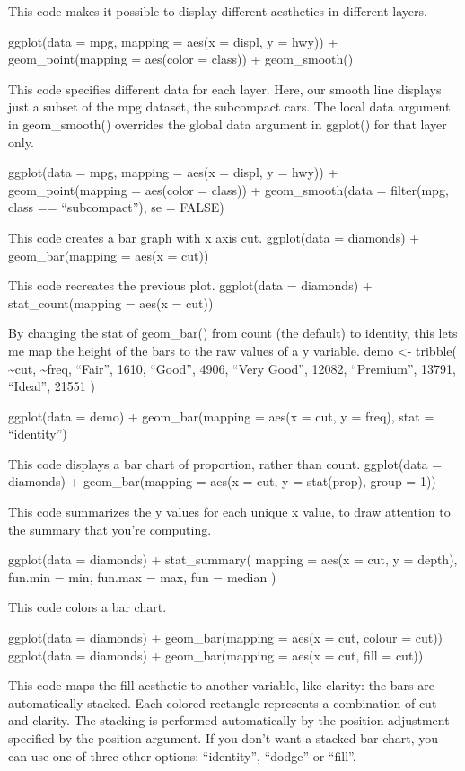 \documentclass[
]{article}
\begin{document}
This code makes it possible to display different aesthetics in different
layers.

ggplot(data = mpg, mapping = aes(x = displ, y = hwy)) +
geom\_point(mapping = aes(color = class)) + geom\_smooth()

This code specifies different data for each layer. Here, our smooth line
displays just a subset of the mpg dataset, the subcompact cars. The
local data argument in geom\_smooth() overrides the global data argument
in ggplot() for that layer only.

ggplot(data = mpg, mapping = aes(x = displ, y = hwy)) +
geom\_point(mapping = aes(color = class)) + geom\_smooth(data =
filter(mpg, class == ``subcompact''), se = FALSE)

This code creates a bar graph with x axis cut. ggplot(data = diamonds) +
geom\_bar(mapping = aes(x = cut))

This code recreates the previous plot. ggplot(data = diamonds) +
stat\_count(mapping = aes(x = cut))

By changing the stat of geom\_bar() from count (the default) to
identity, this lets me map the height of the bars to the raw values of a
y variable. demo \textless- tribble( \textasciitilde cut,
\textasciitilde freq, ``Fair'', 1610, ``Good'', 4906, ``Very Good'',
12082, ``Premium'', 13791, ``Ideal'', 21551 )

ggplot(data = demo) + geom\_bar(mapping = aes(x = cut, y = freq), stat =
``identity'')

This code displays a bar chart of proportion, rather than count.
ggplot(data = diamonds) + geom\_bar(mapping = aes(x = cut, y =
stat(prop), group = 1))

This code summarizes the y values for each unique x value, to draw
attention to the summary that you're computing.

ggplot(data = diamonds) + stat\_summary( mapping = aes(x = cut, y =
depth), fun.min = min, fun.max = max, fun = median )

This code colors a bar chart.

ggplot(data = diamonds) + geom\_bar(mapping = aes(x = cut, colour =
cut)) ggplot(data = diamonds) + geom\_bar(mapping = aes(x = cut, fill =
cut))

This code maps the fill aesthetic to another variable, like clarity: the
bars are automatically stacked. Each colored rectangle represents a
combination of cut and clarity. The stacking is performed automatically
by the position adjustment specified by the position argument. If you
don't want a stacked bar chart, you can use one of three other options:
``identity'', ``dodge'' or ``fill''.
\end{document}
